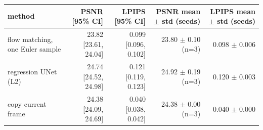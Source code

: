 \footnotesize\renewcommand{\arraystretch}{0.92}
\begin{tabular}{lrrrr}
\toprule
method & PSNR [95\% CI] & LPIPS [95\% CI] & PSNR mean $\pm$ std (seeds) & LPIPS mean $\pm$ std (seeds) \\
\midrule
flow matching, one Euler sample & 23.82 [23.61, 24.04] & 0.099 [0.096, 0.102] & 23.80 $\pm$ 0.10 (n=3) & 0.098 $\pm$ 0.006 \\
regression UNet (L2) & 24.74 [24.52, 24.98] & 0.121 [0.119, 0.123] & 24.92 $\pm$ 0.19 (n=3) & 0.120 $\pm$ 0.003 \\
copy current frame & 24.38 [24.09, 24.69] & 0.040 [0.038, 0.042] & 24.38 $\pm$ 0.00 (n=3) & 0.040 $\pm$ 0.000 \\
\bottomrule
\end{tabular}
